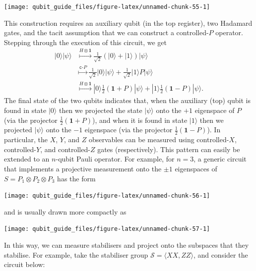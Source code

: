 \documentclass[fleqn,a4paper]{article}
\theoremstyle{definition}
\theoremstyle{definition}
\theoremstyle{definition}
\theoremstyle{definition}
\theoremstyle{remark}
\begin{document}
\begin{center}\texttt{[image: qubit\_guide\_files/figure-latex/unnamed-chunk-55-1]} \end{center}

This construction requires an auxiliary qubit (in the top register), two Hadamard gates, and the tacit assumption that we can construct a controlled-\(P\) operator.
Stepping through the execution of this circuit, we get
\[
  \begin{aligned}
    |0\rangle|\psi\rangle
    &\overset{H\otimes\mathbf{1}}{\longmapsto}
      \frac{1}{\sqrt{2}}(|0\rangle+|1\rangle)|\psi\rangle
  \\&\overset{\texttt{c-}P}{\longmapsto}
      \frac{1}{\sqrt{2}}|0\rangle|\psi\rangle + \frac{1}{\sqrt{2}}|1\rangle P|\psi\rangle
  \\&\overset{H\otimes\mathbf{1}}{\longmapsto}
      |0\rangle\frac{1}{2}(\mathbf{1}+P)|\psi\rangle + |1\rangle\frac{1}{2}(\mathbf{1}-P)|\psi\rangle.
  \end{aligned}
\]
The final state of the two qubits indicates that, when the auxiliary (top) qubit is found in state \(|0\rangle\) then we projected the state \(|\psi\rangle\) onto the \(+1\) eigenspace of \(P\) (via the projector \(\frac{1}{2}(\mathbf{1}+P)\)), and when it is found in state \(|1\rangle\) then we projected \(|\psi\rangle\) onto the \(-1\) eigenspace (via the projector \(\frac{1}{2}(\mathbf{1}-P)\)).
In particular, the \(X\), \(Y\), and \(Z\) observables can be measured using controlled-\(X\), controlled-\(Y\), and controlled-\(Z\) gates (respectively).
This pattern can easily be extended to an \(n\)-qubit Pauli operator.
For example, for \(n=3\), a generic circuit that implements a projective measurement onto the \(\pm1\) eigenspaces of \(S=P_1\otimes P_2\otimes P_3\) has the form

\begin{center}\texttt{[image: qubit\_guide\_files/figure-latex/unnamed-chunk-56-1]} \end{center}

and is usually drawn more compactly as

\begin{center}\texttt{[image: qubit\_guide\_files/figure-latex/unnamed-chunk-57-1]} \end{center}

In this way, we can measure stabilisers and project onto the subspaces that they stabilise.
For example, take the stabiliser group \(\mathcal{S}=\langle XX,ZZ\rangle\), and consider the circuit below:
\end{document}
